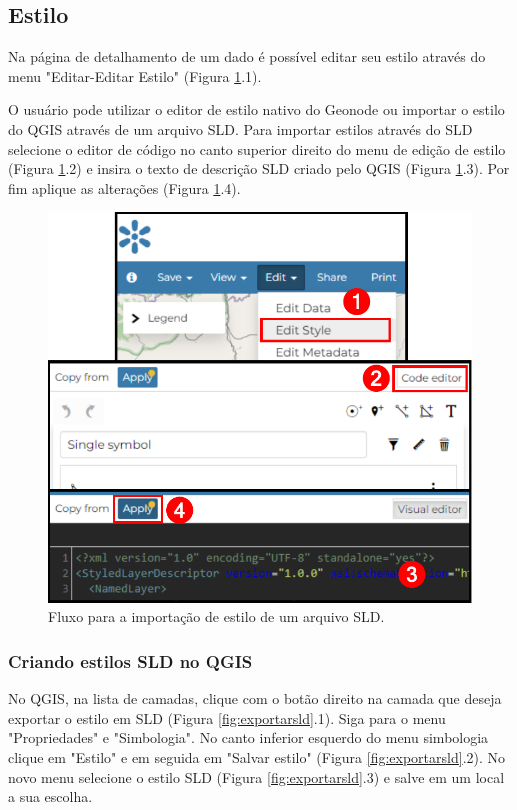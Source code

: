 \documentclass[12pt]{article}
\begin{document}
\subsection{Estilo}

Na página de detalhamento de um dado é possível editar seu estilo através do
menu "Editar-Editar Estilo" (Figura \ref{fig:estilocodigo}.1).

O usuário pode utilizar o editor de estilo nativo do Geonode ou importar o
estilo do QGIS através de um arquivo SLD. Para importar estilos através do SLD
selecione o editor de código no canto superior direito do menu de edição de
estilo (Figura \ref{fig:estilocodigo}.2) e insira o texto de descrição SLD
criado pelo QGIS (Figura \ref{fig:estilocodigo}.3). Por fim aplique as
alterações (Figura \ref{fig:estilocodigo}.4).

\begin{figure}[ht]
  \centering
  \includegraphics[width=\textwidth, keepaspectratio]{img/estilocodigo.pdf}
  \caption{Fluxo para a importação de estilo de um arquivo SLD.}
  \label{fig:estilocodigo}
\end{figure}

\subsubsection{Criando estilos SLD no QGIS}

No QGIS, na lista de camadas, clique com o botão direito na camada que deseja
exportar o estilo em SLD (Figura \ref{fig:exportarsld}.1). Siga para o menu
"Propriedades" e "Simbologia". No canto inferior esquerdo do menu simbologia
clique em "Estilo" e em seguida em "Salvar estilo" (Figura
\ref{fig:exportarsld}.2). No novo menu selecione o estilo SLD (Figura
\ref{fig:exportarsld}.3) e salve em um local a sua escolha.
\end{document}
